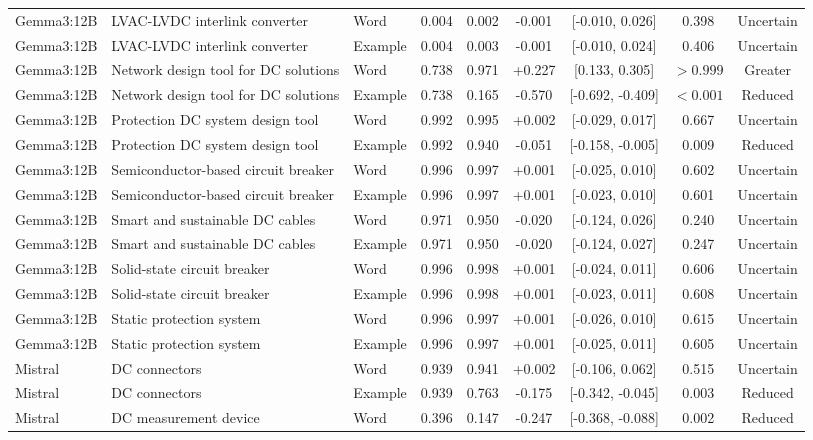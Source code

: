 \begin{landscape}
\begin{longtable}{lllcccccc}
Gemma3:12B & LVAC-LVDC interlink converter & Word & 0.004 & 0.002 & -0.001 & [-0.010, 0.026] & 0.398 & Uncertain \\
Gemma3:12B & LVAC-LVDC interlink converter & Example & 0.004 & 0.003 & -0.001 & [-0.010, 0.024] & 0.406 & Uncertain \\
Gemma3:12B & Network design tool for DC solutions & Word & 0.738 & 0.971 & +0.227 & [0.133, 0.305] & $>0.999$ & Greater \\
Gemma3:12B & Network design tool for DC solutions & Example & 0.738 & 0.165 & -0.570 & [-0.692, -0.409] & $<0.001$ & Reduced \\
Gemma3:12B & Protection DC system design tool & Word & 0.992 & 0.995 & +0.002 & [-0.029, 0.017] & 0.667 & Uncertain \\
Gemma3:12B & Protection DC system design tool & Example & 0.992 & 0.940 & -0.051 & [-0.158, -0.005] & 0.009 & Reduced \\
Gemma3:12B & Semiconductor-based circuit breaker & Word & 0.996 & 0.997 & +0.001 & [-0.025, 0.010] & 0.602 & Uncertain \\
Gemma3:12B & Semiconductor-based circuit breaker & Example & 0.996 & 0.997 & +0.001 & [-0.023, 0.010] & 0.601 & Uncertain \\
Gemma3:12B & Smart and sustainable DC cables & Word & 0.971 & 0.950 & -0.020 & [-0.124, 0.026] & 0.240 & Uncertain \\
Gemma3:12B & Smart and sustainable DC cables & Example & 0.971 & 0.950 & -0.020 & [-0.124, 0.027] & 0.247 & Uncertain \\
Gemma3:12B & Solid-state circuit breaker & Word & 0.996 & 0.998 & +0.001 & [-0.024, 0.011] & 0.606 & Uncertain \\
Gemma3:12B & Solid-state circuit breaker & Example & 0.996 & 0.998 & +0.001 & [-0.023, 0.011] & 0.608 & Uncertain \\
Gemma3:12B & Static protection system & Word & 0.996 & 0.997 & +0.001 & [-0.026, 0.010] & 0.615 & Uncertain \\
Gemma3:12B & Static protection system & Example & 0.996 & 0.997 & +0.001 & [-0.025, 0.011] & 0.605 & Uncertain \\
Mistral & DC connectors & Word & 0.939 & 0.941 & +0.002 & [-0.106, 0.062] & 0.515 & Uncertain \\
Mistral & DC connectors & Example & 0.939 & 0.763 & -0.175 & [-0.342, -0.045] & 0.003 & Reduced \\
Mistral & DC measurement device & Word & 0.396 & 0.147 & -0.247 & [-0.368, -0.088] & 0.002 & Reduced \\

\end{longtable}
\end{landscape}
